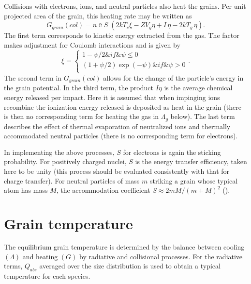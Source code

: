 Collisions with electrons, ions, and neutral particles also heat the
grains.  Per unit projected area of the grain, this heating rate may be
written as
\begin{equation}
{G_{grain}}\left( {col} \right) = n\;\bar v\;S\;\left( {2k{T_e}\xi  -
Z{V_g}\eta  + I\,\eta  - 2k{T_g}\,\eta } \right).
\end{equation}
The first term corresponds to kinetic energy extracted from the gas.  The
factor  makes adjustment for Coulomb interactions and is given by
\begin{equation}
\xi  = \left\{ {\begin{array}{*{20}{c}}
   {1 - \psi /2} \& {if} \& {\psi  \le 0}  \\
   {\left( {1 + \psi /2} \right)\exp \left( { - \psi } \right)} \& {if}
\& {\psi  > 0}  \\
\end{array}} \right..
\end{equation}
The second term in $G_{grain}(col)$ allows for the change of the particle's energy
in the grain potential.  In the third term, the product $I\eta$ is the average
chemical energy released per impact.  Here it is assumed that when impinging
ions recombine the ionization energy released is deposited as heat in the
grain (there is then no corresponding term for heating the gas in
$\Lambda_g$ below).
The last term describes the effect of thermal evaporation of neutralized
ions and thermally accommodated neutral particles (there is no corresponding
term for electrons).

In implementing the above processes, $S$ for electrons is again the sticking
probability.  For positively charged nuclei, $S$ is the energy transfer
efficiency, taken here to be unity (this process should be evaluated
consistently with that for charge transfer).  For neutral particles of mass
$m$ striking a grain whose typical atom has mass $M$, the accommodation
coefficient $S \approx 2 m M/(m + M)^2$ (\citealp{Draine1978}).

\section{Grain temperature}

The equilibrium grain temperature is determined by the balance between
cooling $(\Lambda)$ and heating $(G)$ by radiative and collisional processes.  For
the radiative terms, $Q_{abs}$ averaged over the size distribution is used to
obtain a typical temperature for each species.

